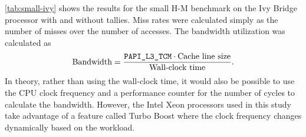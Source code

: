 \documentclass{mc2015}
\begin{document}
\autoref{tab:small-ivy} shows the results for the small H-M benchmark on the Ivy
Bridge processor with and without tallies. Miss rates were calculated simply as
the number of misses over the number of accesses. The bandwidth utilization was
calculated as~\cite{physor-tramm-2014}
\begin{equation}
  \label{eq:bandwidth}
  \text{Bandwidth} = \frac{\text{\texttt{PAPI\_L3\_TCM}}\cdot\text{Cache line
      size}}{\text{Wall-clock time}}.
\end{equation}
In theory, rather than using the wall-clock time, it would also be possible to
use the CPU clock frequency and a performance counter for the number of cycles
to calculate the bandwidth. However, the Intel Xeon processors used in this
study take advantage of a feature called Turbo Boost where the clock frequency
changes dynamically based on the workload.
\end{document}
